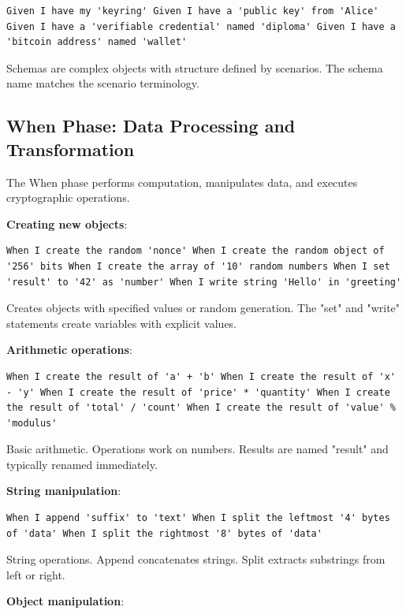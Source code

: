 \begin{verbatim}
Given I have my 'keyring' Given I have a 'public key' from 'Alice'
Given I have a 'verifiable credential' named 'diploma' Given I have a
'bitcoin address' named 'wallet'
\end{verbatim}

Schemas are complex objects with structure defined by scenarios. The
schema name matches the scenario terminology.

\subsection{When Phase: Data Processing and Transformation}

The When phase performs computation, manipulates data, and executes
cryptographic operations.

\textbf{Creating new objects}:

\begin{verbatim}
When I create the random 'nonce' When I create the random object of
'256' bits When I create the array of '10' random numbers When I set
'result' to '42' as 'number' When I write string 'Hello' in 'greeting'
\end{verbatim}

Creates objects with specified values or random generation. The "set"
and "write" statements create variables with explicit values.

\textbf{Arithmetic operations}:

\begin{verbatim}
When I create the result of 'a' + 'b' When I create the result of 'x'
- 'y' When I create the result of 'price' * 'quantity' When I create
the result of 'total' / 'count' When I create the result of 'value' %
'modulus'
\end{verbatim}

Basic arithmetic. Operations work on numbers. Results are named
"result" and typically renamed immediately.

\textbf{String manipulation}:

\begin{verbatim}
When I append 'suffix' to 'text' When I split the leftmost '4' bytes
of 'data' When I split the rightmost '8' bytes of 'data'
\end{verbatim}

String operations. Append concatenates strings. Split extracts
substrings from left or right.

\textbf{Object manipulation}:

